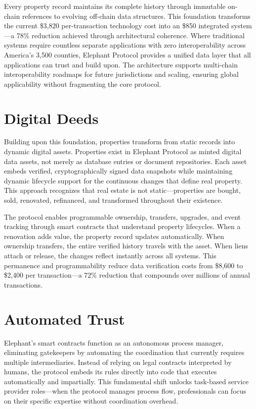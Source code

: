 Every property record maintains its complete history through immutable on-chain references to evolving off-chain data structures. This foundation transforms the current \$3,820 per-transaction technology cost into an \$850 integrated system---a 78\% reduction achieved through architectural coherence. Where traditional systems require countless separate applications with zero interoperability across America's 3,500 counties, Elephant Protocol provides a unified data layer that all applications can trust and build upon. The architecture supports multi-chain interoperability roadmaps for future jurisdictions and scaling, ensuring global applicability without fragmenting the core protocol.

\section{Digital Deeds}

Building upon this foundation, properties transform from static records into dynamic digital assets. Properties exist in Elephant Protocol as minted digital data assets, not merely as database entries or document repositories. Each asset embeds verified, cryptographically signed data snapshots while maintaining dynamic lifecycle support for the continuous changes that define real property. This approach recognizes that real estate is not static---properties are bought, sold, renovated, refinanced, and transformed throughout their existence.

The protocol enables programmable ownership, transfers, upgrades, and event tracking through smart contracts that understand property lifecycles. When a renovation adds value, the property record updates automatically. When ownership transfers, the entire verified history travels with the asset. When liens attach or release, the changes reflect instantly across all systems. This permanence and programmability reduce data verification costs from \$8,600 to \$2,400 per transaction---a 72\% reduction that compounds over millions of annual transactions.

\section{Automated Trust}

Elephant's smart contracts function as an autonomous process manager, eliminating gatekeepers by automating the coordination that currently requires multiple intermediaries. Instead of relying on legal contracts interpreted by humans, the protocol embeds its rules directly into code that executes automatically and impartially. This fundamental shift unlocks task-based service provider roles---when the protocol manages process flow, professionals can focus on their specific expertise without coordination overhead.

